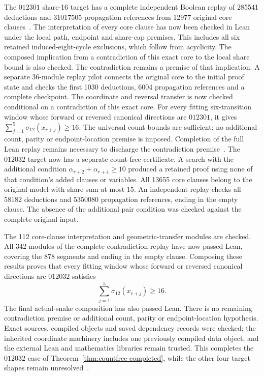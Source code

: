 \documentclass[11pt,a4paper]{article}
\theoremstyle{definition}
\theoremstyle{remark}
\begin{document}
The $012301$ share-16 target has a complete independent Boolean replay of
285541 deductions and 31017505 propagation references from 12977 original
core clauses~\cite{share145archive}. The interpretation of every core clause
has now been checked in Lean under the local path, endpoint and share-cap
premises. This includes all six retained induced-eight-cycle exclusions,
which follow from acyclicity. The composed implication from a contradiction
of this exact core to the local share bound is also checked. The contradiction
remains a premise of that implication. A separate 36-module replay pilot
connects the original core to the initial proof state and checks the first
1030 deductions, 6004 propagation references and a complete checkpoint.
The coordinate and reversal transfer is now checked conditional on a
contradiction of this exact core. For every fitting six-transition window
whose forward or reversed canonical directions are $012301$, it gives
$\sum_{j=1}^{5}\sigma_{12}(x_{r+j})\ge16$. The universal count bounds are
sufficient; no additional count, parity or endpoint-location premise is
imposed. Completion of the full Lean replay remains necessary to discharge
the contradiction premise~\cite{semantics147archive,transfer148archive}.
The $012032$ target now has a separate count-free certificate. A search
with the additional condition $\alpha_{r+2}+\alpha_{r+4}\ge10$ produced
a retained proof using none of that condition's added clauses or variables.
All 13655 core clauses belong to the original model with share sum at most
15. An independent replay checks all 58182 deductions and 5350080
propagation references, ending in the empty clause. The absence of the
additional pair condition was checked against the complete original input.

The 112 core-clause interpretation and geometric-transfer modules are
checked. All 342 modules of the complete contradiction replay have now
passed Lean, covering the 878 segments and ending in the empty clause.
Composing these results proves that every fitting window whose forward
or reversed canonical directions are $012032$ satisfies
\[
\sum_{j=1}^{5}\sigma_{12}(x_{r+j})\ge16.
\]
The final actual-snake composition has also passed Lean. There is no
remaining contradiction premise or additional count, parity or
endpoint-location hypothesis. Exact sources, compiled objects and saved
dependency records were checked; the inherited coordinate machinery
includes one previously compiled data object, and the external Lean and
mathematics libraries remain trusted. This completes the $012032$ case
of Theorem~\ref{thm:countfree-completed}, while the other four target
shapes remain unresolved~\cite{share150archive,pilot151archive,share152archive}.
\end{document}
